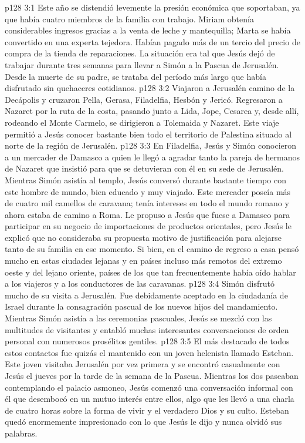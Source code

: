 \vs p128 3:1 Este año se distendió levemente la presión económica que soportaban, ya que había cuatro miembros de la familia con trabajo. Miriam obtenía considerables ingresos gracias a la venta de leche y mantequilla; Marta se había convertido en una experta tejedora. Habían pagado más de un tercio del precio de compra de la tienda de reparaciones. La situación era tal que Jesús dejó de trabajar durante tres semanas para llevar a Simón a la Pascua de Jerusalén. Desde la muerte de su padre, se trataba del período más largo que había disfrutado sin quehaceres cotidianos.
\vs p128 3:2 Viajaron a Jerusalén camino de la Decápolis y cruzaron Pella, Gerasa, Filadelfia, Hesbón y Jericó. Regresaron a Nazaret por la ruta de la costa, pasando junto a Lida, Jope, Cesarea y, desde allí, rodeando el Monte Carmelo, se dirigieron a Tolemaida y Nazaret. Este viaje permitió a Jesús conocer bastante bien todo el territorio de Palestina situado al norte de la región de Jerusalén.
\vs p128 3:3 En Filadelfia, Jesús y Simón conocieron a un mercader de Damasco a quien le llegó a agradar tanto la pareja de hermanos de Nazaret que insistió para que se detuvieran con él en su sede de Jerusalén. Mientras Simón asistía al templo, Jesús conversó durante bastante tiempo con este hombre de mundo, bien educado y muy viajado. Este mercader poseía más de cuatro mil camellos de caravana; tenía intereses en todo el mundo romano y ahora estaba de camino a Roma. Le propuso a Jesús que fuese a Damasco para participar en su negocio de importaciones de productos orientales, pero Jesús le explicó que no consideraba su propuesta motivo de justificación para alejarse tanto de su familia en ese momento. Si bien, en el camino de regreso a casa pensó mucho en estas ciudades lejanas y en países incluso más remotos del extremo oeste y del lejano oriente, países de los que tan frecuentemente había oído hablar a los viajeros y a los conductores de las caravanas.
\vs p128 3:4 Simón disfrutó mucho de su visita a Jerusalén. Fue debidamente aceptado en la ciudadanía de Israel durante la consagración pascual de los nuevos hijos del mandamiento. Mientras Simón asistía a las ceremonias pascuales, Jesús se mezcló con las multitudes de visitantes y entabló muchas interesantes conversaciones de orden personal con numerosos prosélitos gentiles.
\vs p128 3:5 El más destacado de todos estos contactos fue quizás el mantenido con un joven helenista llamado Esteban. Este joven visitaba Jerusalén por vez primera y se encontró casualmente con Jesús el jueves por la tarde de la semana de la Pascua. Mientras los dos paseaban contemplando el palacio asmoneo, Jesús comenzó una conversación informal con él que desembocó en un mutuo interés entre ellos, algo que les llevó a una charla de cuatro horas sobre la forma de vivir y el verdadero Dios y su culto. Esteban quedó enormemente impresionado con lo que Jesús le dijo y nunca olvidó sus palabras.
